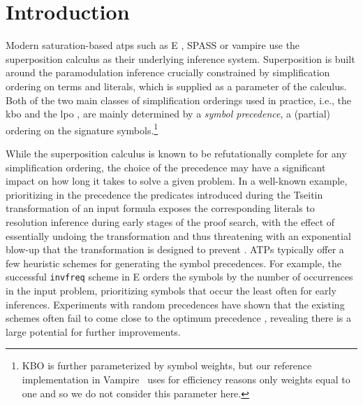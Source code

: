 \documentclass{ceurart}
\begin{document}
\section{Introduction}

Modern saturation-based \glspl*{atp} such as E \cite{SCV:CADE-2019}, SPASS \cite{DBLP:conf/cade/WeidenbachDFKSW09} 
or \gls*{vampire} \cite{Kovacs2013}
use the superposition calculus \cite{DBLP:books/el/RV01/NieuwenhuisR01} as their underlying inference system.
Superposition is built around the paramodulation inference \cite{Robinson1983} crucially
constrained by simplification ordering on terms and literals, which is supplied as a parameter of the calculus.
Both of the two main classes of simplification orderings used in practice,
i.e., the \acrlong*{kbo} \cite{Knuth1983}
and the \acrlong*{lpo} \cite{Kamin1980},
are mainly determined by a %
\emph{symbol precedence}, a (partial) ordering on the signature symbols.\footnote{KBO is further parameterized by symbol weights, but our reference implementation in Vampire~\cite{Kovacs2013} 
uses for efficiency reasons only weights equal to one \cite{DBLP:conf/cade/KovacsMV11} and so we do not consider this parameter here.}

While the superposition calculus is known \cite{DBLP:journals/logcom/BachmairG94} to be refutationally complete for any simplification ordering, the choice of the precedence may have a significant impact on how long it takes to solve a given problem.
In a well-known example, prioritizing in the precedence the predicates introduced during the Tseitin transformation of an input formula \cite{Tseitin1983} exposes the corresponding literals to resolution inference during early stages of the proof search,
with the effect of essentially undoing the transformation and thus threatening with an exponential blow-up
that the transformation is designed to prevent \cite{Reger2016}.
%
ATPs typically offer a few heuristic schemes for generating the symbol precedences.
For example, the successful \texttt{invfreq} scheme in E \cite{E-manual} orders the symbols by the number of occurrences in the input problem,
prioritizing symbols that occur the least often for early inferences.
Experiments with random precedences have shown that the existing schemes often fail to come close to the optimum precedence \cite{RegerSuda2017}, revealing there is a large potential for further improvements.
\end{document}
